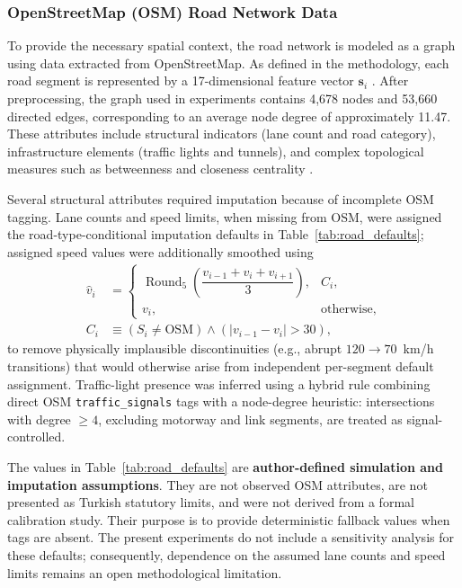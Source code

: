 \documentclass[journal]{IEEEtran}
\begin{document}
\subsubsection{OpenStreetMap (OSM) Road Network Data}
\label{sec:osm_data}
To provide the necessary spatial context, the road network is modeled as a graph using data extracted from OpenStreetMap. As defined in the methodology, each road segment is represented by a 17-dimensional feature vector $\mathbf{s}_i$ \cite{zhong_multi-factor_2025}. After preprocessing, the graph used in experiments contains 4,678 nodes and 53,660 directed edges, corresponding to an average node degree of approximately 11.47. These attributes include structural indicators (lane count and road category), infrastructure elements (traffic lights and tunnels), and complex topological measures such as betweenness and closeness centrality \cite{li_graph_2023, zhong_multi-factor_2025}.

Several structural attributes required imputation because of incomplete OSM tagging. Lane counts and speed limits, when missing from OSM, were assigned the road-type-conditional imputation defaults in Table~\ref{tab:road_defaults}; assigned speed values were additionally smoothed using
\begin{equation}
  \begin{aligned}
    \hat{v}_i & =
    \begin{cases}
      \operatorname{Round}_5\!\left(\dfrac{v_{i-1}+v_i+v_{i+1}}{3}\right), & C_i,\\
      v_i, & \text{otherwise},
    \end{cases}\\
    C_i & \equiv (S_i \neq \mathrm{OSM}) \land (|v_{i-1}-v_i|>30),
  \end{aligned}
\end{equation}
to remove physically implausible discontinuities (e.g., abrupt $120\rightarrow70$~km/h transitions) that would otherwise arise from independent per-segment default assignment. Traffic-light presence was inferred using a hybrid rule combining direct OSM \texttt{traffic\_signals} tags with a node-degree heuristic: intersections with degree $\geq4$, excluding motorway and link segments, are treated as signal-controlled.

The values in Table~\ref{tab:road_defaults} are \textbf{author-defined simulation and imputation assumptions}. They are not observed OSM attributes, are not presented as Turkish statutory limits, and were not derived from a formal calibration study. Their purpose is to provide deterministic fallback values when tags are absent. The present experiments do not include a sensitivity analysis for these defaults; consequently, dependence on the assumed lane counts and speed limits remains an open methodological limitation.
\end{document}
